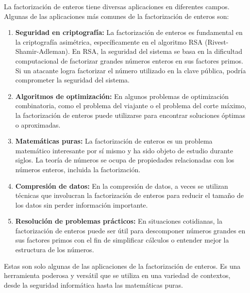 La factorización de enteros  tiene diversas aplicaciones en diferentes campos. Algunas de las aplicaciones más comunes de la factorización de enteros son:

\begin{enumerate}
	\item \textbf{Seguridad en criptografía:} La factorización de enteros es fundamental en la criptografía asimétrica, específicamente en el algoritmo RSA (Rivest-Shamir-Adleman). En RSA, la seguridad del sistema se basa en la dificultad computacional de factorizar grandes números enteros en sus factores primos. Si un atacante logra factorizar el número utilizado en la clave pública, podría comprometer la seguridad del sistema.
	 
	\item \textbf{Algoritmos de optimización:} En algunos problemas de optimización combinatoria, como el problema del viajante o el problema del corte máximo, la factorización de enteros puede utilizarse para encontrar soluciones óptimas o aproximadas.
	 
	\item \textbf{Matemáticas puras:} La factorización de enteros es un problema matemático interesante por sí mismo y ha sido objeto de estudio durante siglos. La teoría de números se ocupa de propiedades relacionadas con los números enteros, incluida la factorización.
	 
	\item \textbf{Compresión de datos:} En la compresión de datos, a veces se utilizan técnicas que involucran la factorización de enteros para reducir el tamaño de los datos sin perder información importante.
	
	\item \textbf{Resolución de problemas prácticos:} En situaciones cotidianas, la factorización de enteros puede ser útil para descomponer números grandes en sus factores primos con el fin de simplificar cálculos o entender mejor la estructura de los números.
	 
\end{enumerate}

Estas son solo algunas de las aplicaciones de la factorización de enteros. Es una herramienta poderosa y versátil que se utiliza en una variedad de contextos, desde la seguridad informática hasta las matemáticas puras.